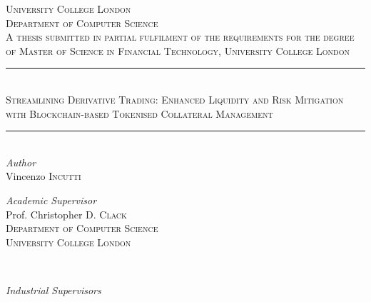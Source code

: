 \begin{titlepage} %
	\newcommand{\HRule}{\rule{\linewidth}{0.5mm}} %
	
	\center %
	\textsc{\LARGE University College London}\\[1.5cm] %
	
	\textsc{\Large Department of Computer Science}\\[0.5cm] %
	
	\textsc{\large A thesis submitted in partial fulfilment of the requirements for the degree of Master of Science in Financial Technology, University College London}\\[0.5cm] %
	\HRule\\[0.4cm]
	\textsc{\huge Streamlining Derivative Trading: Enhanced Liquidity and Risk Mitigation with Blockchain-based Tokenised Collateral Management }\\[0.4cm] %
	\HRule\\[1.5cm]
	{\large\textit{Author}}\\
	Vincenzo \textsc{Incutti} %
	\vfill
	\begin{minipage}{0.48\textwidth}
		\begin{flushleft}
			\large
			\textit{Academic Supervisor}\\
			Prof. Christopher D. \textsc{Clack}\\ %
			\textsc{Department of Computer Science}\\
			\textsc{University College London}
		\end{flushleft}
	\end{minipage}
	~%
	\begin{minipage}{0.48\textwidth}
            \begin{flushright}
                \large
                \textit{Industrial Supervisors}\\

\end{flushright}
\end{minipage}
\end{titlepage}
